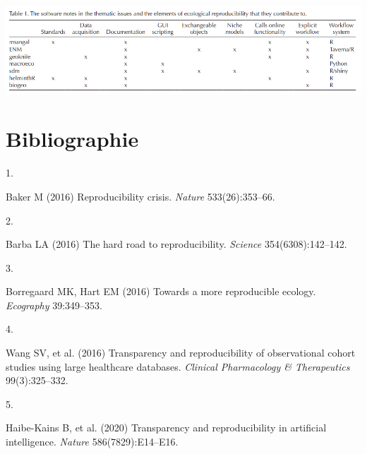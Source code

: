 \documentclass[9pt,twocolumn,twoside,]{pnas-new}
\newlength{\cslhangindent}
\newlength{\csllabelwidth}
\newlength{\cslentryspacingunit} %
\newenvironment{CSLReferences}[2] %
 {%
  \setlength{\parindent}{0pt}
  \ifodd #1
  \let\oldpar\par
  \def\par{\hangindent=\cslhangindent\oldpar}
  \fi
  \setlength{\parskip}{#2\cslentryspacingunit}
 }%
 {}
\newcommand{\CSLLeftMargin}[1]{\parbox[t]{\csllabelwidth}{#1}}
\newcommand{\CSLRightInline}[1]{\parbox[t]{\linewidth - \csllabelwidth}{#1}\break}
\begin{document}
\href{@borregaard2016towards}{\includegraphics{images/Borregaard2016-01.png}}

\newpage
\newpage

\hypertarget{bibliographie}{%
\section*{Bibliographie}\label{bibliographie}}

\hypertarget{refs}{}
\begin{CSLReferences}{0}{0}
\leavevmode{}%
\CSLLeftMargin{1. }
\CSLRightInline{Baker M (2016) Reproducibility crisis. \emph{Nature}
533(26):353--66.}

\leavevmode{}%
\CSLLeftMargin{2. }
\CSLRightInline{Barba LA (2016) The hard road to reproducibility.
\emph{Science} 354(6308):142--142.}

\leavevmode{}%
\CSLLeftMargin{3. }
\CSLRightInline{Borregaard MK, Hart EM (2016) Towards a more
reproducible ecology. \emph{Ecography} 39:349--353.}

\leavevmode{}%
\CSLLeftMargin{4. }
\CSLRightInline{Wang SV, et al. (2016) Transparency and reproducibility
of observational cohort studies using large healthcare databases.
\emph{Clinical Pharmacology \& Therapeutics} 99(3):325--332.}

\leavevmode{}%
\CSLLeftMargin{5. }
\CSLRightInline{Haibe-Kains B, et al. (2020) Transparency and
reproducibility in artificial intelligence. \emph{Nature}
586(7829):E14--E16.}

\end{CSLReferences}



% 
\end{document}
